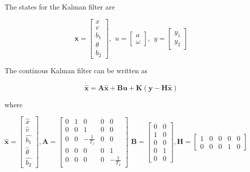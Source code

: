 \documentclass{article}
\begin{document}
The states for the Kalman filter are

\begin{equation}
	\bm{x} =
	\begin{bmatrix}
		x \\ v \\ b_1 \\ \theta \\ b_2
	\end{bmatrix}
	, \hspace{5pt} u = 
	\begin{bmatrix}
		a \\ \omega
	\end{bmatrix}
	, \hspace{5pt} y = 
	\begin{bmatrix}
		y_1 \\ y_2
	\end{bmatrix}
\end{equation}

The continous Kalman filter can be written as

\begin{equation}
	\dot{\hat{\bm{x}}} = \bm{A}\hat{\bm{x}} + \bm{B}\bm{u} + \bm{K}(\bm{y}-\bm{H}\hat{\bm{x}})
\end{equation}

where

\begin{center}
\begin{math}
	\hat{\bm{x}} = 
	\begin{bmatrix}
		\hat{x} \\ \hat{v} \\ \hat{b_1} \\ \hat{\theta} \\ \hat{b_2}
	\end{bmatrix}
	, \bm{A} = 
	\begin{bmatrix}
		0 & 1 & 0 & 0 & 0 \\
		0 & 0 & 1 & 0 & 0 \\
		0 & 0 & -\frac{1}{T_1} & 0 & 0 \\
		0 & 0 & 0 & 0 & 1 \\
		0 & 0 & 0 & 0 & -\frac{1}{T_2}
	\end{bmatrix}
\end{math}
\begin{math}
	\bm{B} = 
	\begin{bmatrix}
		0 & 0 \\
		1 & 0 \\
		0 & 0 \\
		0 & 1 \\
		0 & 0
	\end{bmatrix}
	, \bm{H} = 
	\begin{bmatrix}
		1 & 0 & 0 & 0 & 0 \\
		0 & 0 & 0 & 1 & 0
	\end{bmatrix}
\end{math}
\end{center}
\end{document}
